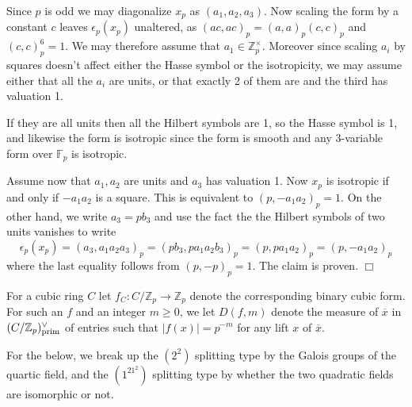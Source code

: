 \documentclass{article}
\def\Z{{\mathbb Z}}
\def\ra{{\rightarrow}}
\def\prim{{\rm prim}}
\def\F{{\mathbb F}}
\def\Z{{\mathbb Z}}
\def\F{{\mathbb F}}
\def\ol{\overline}
\newenvironment{proof}{\noindent {\bf Proof:}}{$\Box$ \vspace{2 ex}}
\begin{document}
\begin{proof}
    Since $p$ is odd we may diagonalize $x_p$ as $(a_1,a_2,a_3)$. Now scaling the form by a constant $c$ leaves $\epsilon_p(x_p)$ unaltered, as $(ac,ac)_p=(a,a)_p(c,c)_p$ and $(c,c)_p^6=1$. We may therefore assume that $a_1\in \Z_p^{\times}$. Moreover since scaling $a_i$ by squares doesn't affect either the Hasse symbol or the isotropicity, we may assume either that all the $a_i$ are units, or that exactly 2 of them are and the third has valuation 1.

    If they are all units then all the Hilbert symbols are 1, so the Hasse symbol is 1, and likewise the form is isotropic since the form is smooth and any 3-variable form over $\F_p$ is isotropic.

    Assume now that $a_1,a_2$ are units and $a_3$ has valuation 1. Now $x_p$ is isotropic if and only if $-a_1a_2$ is a square. This is equivalent to $(p,-a_1a_2)_p=1$. On the other hand, we write $a_3=pb_3$ and use the fact the the Hilbert symbols of two units vanishes to write
    $$\epsilon_p(x_p)=(a_3,a_1a_2a_3)_p=(pb_3,pa_1a_2b_3)_p=(p,pa_1a_2)_p=(p,-a_1a_2)_p$$ where the last equality follows from $(p,-p)_p=1$. The claim is proven.
\end{proof}

 

For a cubic ring $C$ let $f_C:C/\Z_p\ra \Z_p$ denote the corresponding binary cubic form. For such an $f$ and an integer $m\geq 0$, we let $D(f,m)$ denote the measure of $\ol{x}$ in $(C/\Z_p)^{\vee}_{\prim}$ of entries such that $|f(x)|=p^{-m}$ for any lift $x$ of $\ol{x}$. 

For the below, we break up the $(2^2)$ splitting type by the Galois groups of the quartic field, and the $(1^21^2)$ splitting type by whether the two quadratic fields are isomorphic or not.
\end{document}
